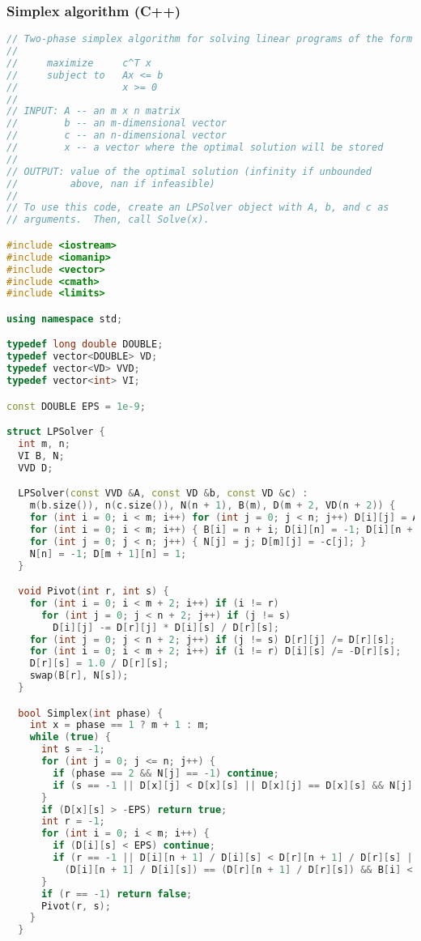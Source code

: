 \subsubsection{Simplex algorithm (C++)}
\begin{lstlisting}[language=C++]
// Two-phase simplex algorithm for solving linear programs of the form
//
//     maximize     c^T x
//     subject to   Ax <= b
//                  x >= 0
//
// INPUT: A -- an m x n matrix
//        b -- an m-dimensional vector
//        c -- an n-dimensional vector
//        x -- a vector where the optimal solution will be stored
//
// OUTPUT: value of the optimal solution (infinity if unbounded
//         above, nan if infeasible)
//
// To use this code, create an LPSolver object with A, b, and c as
// arguments.  Then, call Solve(x).

#include <iostream>
#include <iomanip>
#include <vector>
#include <cmath>
#include <limits>

using namespace std;

typedef long double DOUBLE;
typedef vector<DOUBLE> VD;
typedef vector<VD> VVD;
typedef vector<int> VI;

const DOUBLE EPS = 1e-9;

struct LPSolver {
  int m, n;
  VI B, N;
  VVD D;

  LPSolver(const VVD &A, const VD &b, const VD &c) :
    m(b.size()), n(c.size()), N(n + 1), B(m), D(m + 2, VD(n + 2)) {
    for (int i = 0; i < m; i++) for (int j = 0; j < n; j++) D[i][j] = A[i][j];
    for (int i = 0; i < m; i++) { B[i] = n + i; D[i][n] = -1; D[i][n + 1] = b[i]; }
    for (int j = 0; j < n; j++) { N[j] = j; D[m][j] = -c[j]; }
    N[n] = -1; D[m + 1][n] = 1;
  }

  void Pivot(int r, int s) {
    for (int i = 0; i < m + 2; i++) if (i != r)
      for (int j = 0; j < n + 2; j++) if (j != s)
        D[i][j] -= D[r][j] * D[i][s] / D[r][s];
    for (int j = 0; j < n + 2; j++) if (j != s) D[r][j] /= D[r][s];
    for (int i = 0; i < m + 2; i++) if (i != r) D[i][s] /= -D[r][s];
    D[r][s] = 1.0 / D[r][s];
    swap(B[r], N[s]);
  }

  bool Simplex(int phase) {
    int x = phase == 1 ? m + 1 : m;
    while (true) {
      int s = -1;
      for (int j = 0; j <= n; j++) {
        if (phase == 2 && N[j] == -1) continue;
        if (s == -1 || D[x][j] < D[x][s] || D[x][j] == D[x][s] && N[j] < N[s]) s = j;
      }
      if (D[x][s] > -EPS) return true;
      int r = -1;
      for (int i = 0; i < m; i++) {
        if (D[i][s] < EPS) continue;
        if (r == -1 || D[i][n + 1] / D[i][s] < D[r][n + 1] / D[r][s] ||
          (D[i][n + 1] / D[i][s]) == (D[r][n + 1] / D[r][s]) && B[i] < B[r]) r = i;
      }
      if (r == -1) return false;
      Pivot(r, s);
    }
  }


\end{lstlisting}
